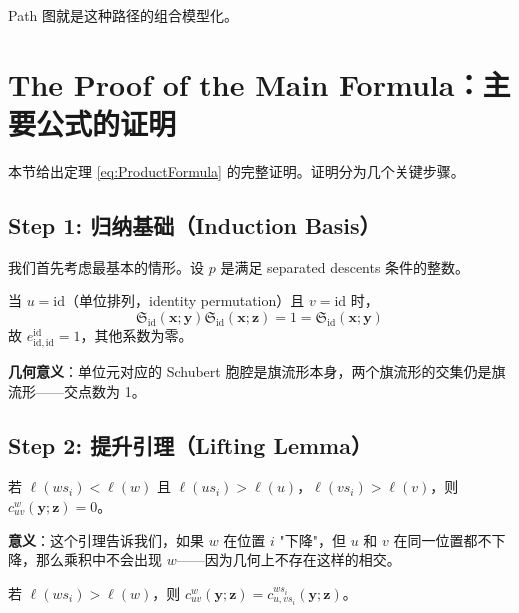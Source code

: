 Path 图就是这种路径的组合模型化。

\section{The Proof of the Main Formula：主要公式的证明}
\label{sec:MainProof}

本节给出定理 \cref{eq:ProductFormula} 的完整证明。证明分为几个关键步骤。

\subsection{Step 1: 归纳基础（Induction Basis）}
\label{sec:ProofStep1}

我们首先考虑最基本的情形。设 $p$ 是满足 separated descents 条件的整数。

当 $u = \mathrm{id}$（单位排列，identity permutation）且 $v = \mathrm{id}$ 时，
\begin{equation}
\mathfrak{S}_{\mathrm{id}}(\mathbf{x}; \mathbf{y}) \mathfrak{S}_{\mathrm{id}}(\mathbf{x}; \mathbf{z}) = 1 = \mathfrak{S}_{\mathrm{id}}(\mathbf{x}; \mathbf{y})
\label{eq:ProofBaseCase}
\end{equation}
故 $e_{\mathrm{id}, \mathrm{id}}^{\mathrm{id}} = 1$，其他系数为零。

\textbf{几何意义}：单位元对应的 Schubert 胞腔是旗流形本身，两个旗流形的交集仍是旗流形——交点数为 1。

\subsection{Step 2: 提升引理（Lifting Lemma）}
\label{sec:ProofStep2}

\begin{Lemma}
\label{eq:ReductionCondition}
若 $\ell(ws_i) < \ell(w)$ 且 $\ell(us_i) > \ell(u)$，$\ell(vs_i) > \ell(v)$，则 $c_{uv}^w(\mathbf{y}; \mathbf{z}) = 0$。
\end{Lemma}

\textbf{意义}：这个引理告诉我们，如果 $w$ 在位置 $i$ "下降"，但 $u$ 和 $v$ 在同一位置都不下降，那么乘积中不会出现 $w$——因为几何上不存在这样的相交。

\begin{Lemma}
\label{eq:LiftingLemma}
若 $\ell(ws_i) > \ell(w)$，则 $c_{uv}^w(\mathbf{y}; \mathbf{z}) = c_{u, vs_i}^{ws_i}(\mathbf{y}; \mathbf{z})$。
\end{Lemma}

